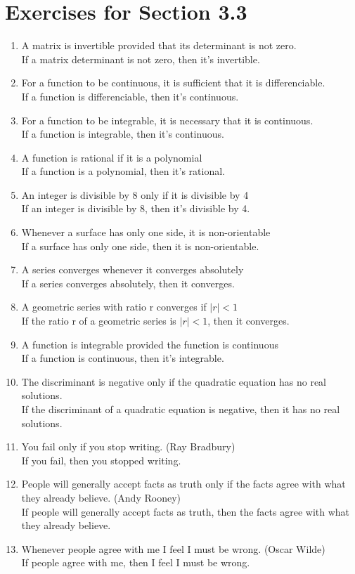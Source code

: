\documentclass[12pt]{article}
\begin{document}
\section*{Exercises for Section 3.3}
\begin{enumerate}
	\item A matrix is invertible provided that its determinant is not zero.\\
	    If a matrix determinant is not zero, then it's invertible.
	\item For a function to be continuous, it is sufficient that it is differenciable.\\
	    If a function is differenciable, then it's continuous.
	\item For a function to be integrable, it is necessary that it is continuous.\\
	    If a function is integrable, then it's continuous.
	\item A function is rational if it is a polynomial\\
	    If a function is a polynomial, then it's rational.
	\item An integer is divisible by 8 only if it is divisible by 4\\
	    If an integer is divisible by 8, then it's divisible by 4.
	\item Whenever a surface has only one side, it is non-orientable\\
	    If a surface has only one side, then it is non-orientable.
	\item A series converges whenever it converges absolutely\\
	    If a series converges absolutely, then it converges.
	\item A geometric series with ratio r converges if $|r| < 1$\\
	    If the ratio r of a geometric series is $|r| < 1$, then it converges.
	\item A function is integrable provided the function is continuous\\
	    If a function is continuous, then it's integrable.
	\item The discriminant is negative only if the quadratic equation has no real solutions.\\
	    If the discriminant of a quadratic equation is negative, then it has no real solutions.
	\item You fail only if you stop writing. (Ray Bradbury)\\
	    If you fail, then you stopped writing.
	\item People will generally accept facts as truth only if the facts agree with what they already believe. (Andy Rooney)\\
	    If people will generally accept facts as truth, then the facts agree with what they already believe.
	\item Whenever people agree with me I feel I must be wrong. (Oscar Wilde)\\
	    If people agree with me, then I feel I must be wrong.
\end{enumerate}
\end{document}

